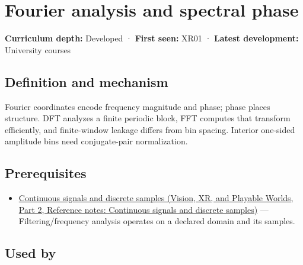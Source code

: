 \hypertarget{appendix-b60686ba06a1}{}\label{referencestart:appendix-b60686ba06a1}
\section{Fourier analysis and spectral phase}\label{appendix-b60686ba06a1-fourier-analysis-and-spectral-phase}

\hypertarget{appendix-b60686ba06a1-fourier-analysis-and-spectral-phase}{}

\textbf{Curriculum depth:} Developed · \textbf{First seen:} XR01 · \textbf{Latest development:} University courses

\begin{allmightroledefinition}

\subsection{Definition and mechanism}\label{appendix-b60686ba06a1-definition-and-mechanism}

\hypertarget{appendix-b60686ba06a1-definition-and-mechanism}{}

Fourier coordinates encode frequency magnitude and phase; phase places structure. DFT analyzes a finite periodic block, FFT computes that transform efficiently, and finite-window leakage differs from bin spacing. Interior one-sided amplitude bins need conjugate-pair normalization.

\end{allmightroledefinition}

\subsection{Prerequisites}\label{appendix-b60686ba06a1-prerequisites}

\hypertarget{appendix-b60686ba06a1-prerequisites}{}

\begin{itemize}
\tightlist
\item
  \href{../07-Vision-XR-and-Playable-Worlds-P02/main.pdf\#nameddest=appendix-1077ea8fc737}{Continuous signals and discrete samples (Vision, XR, and Playable Worlds, Part 2, Reference notes: Continuous signals and discrete samples)} --- Filtering/frequency analysis operates on a declared domain and its samples.
\end{itemize}

\subsection{Used by}\label{appendix-b60686ba06a1-used-by}

